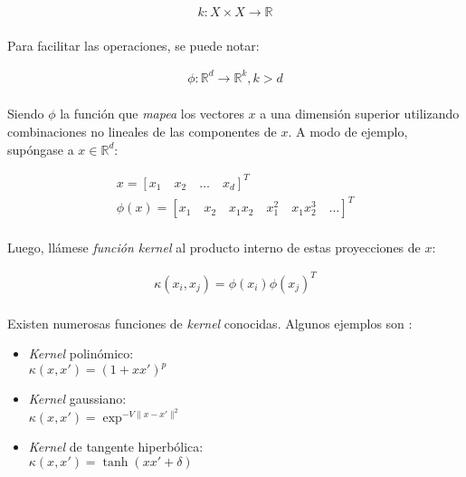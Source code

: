 \documentclass[12pt, twocolumn]{article}
\begin{document}
	\begin{align}
		k : X \times X \to \mathbb{R}
	\end{align}
	
	\paragraph{} Para facilitar las operaciones, se puede notar:
	
	\begin{align}
		\phi : \mathbb{R}^{d} \to \mathbb{R}^{k} , k > d
	\end{align}
	
	\paragraph{} Siendo $\phi$ la función que \textit{mapea} los vectores $x$ a una dimensión superior utilizando combinaciones no lineales de las componentes de $x$. A modo de ejemplo, supóngase a $x \in \mathbb{R}^{d}$:
	
	\begin{align*}
		x = \left[x_{1}\quad x_{2}\quad\dots\quad x_{d}\right]^{T} \\ 
		\phi(x) = \left[x_{1}\quad x_{2}\quad x_{1}x_{2}\quad x_{1}^{2}\quad x_{1}x_{2}^{3} \quad \dots\right]^{T}
	\end{align*}
	
	\paragraph{} Luego, llámese \textit{función kernel} al producto interno de estas proyecciones de $x$:
	
	\begin{align}
		\kappa(x_{i}, x_{j}) = \phi(x_{i})\phi(x_{j})^{T}
	\end{align}
	
	\paragraph{} Existen numerosas funciones de \textit{kernel} conocidas. Algunos ejemplos son \cite{kernex}:
	
	\begin{itemize}
		\item \textit{Kernel} polinómico: \\ $\kappa(x,x')=(1+xx')^{p}$
		\item \textit{Kernel} gaussiano: \\ $\kappa(x,x')=\exp^{-V\lVert x-x'\rVert^{2}}$
		\item \textit{Kernel} de tangente hiperbólica: \\ $\kappa(x,x')=\tanh(xx'+\delta)$
	\end{itemize}
	
\end{document}
